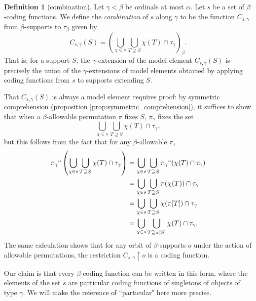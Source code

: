 \documentclass{article}
\theoremstyle{definition}
\newtheorem{definition}[theorem]{Definition}
\theoremstyle{remark}
\begin{document}
\begin{definition}[combination]\label{def:combination}
Let $\gamma < \beta$ be ordinals at most $\alpha$.
Let $s$ be a set of $\beta$-coding functions.
We define the {\em combination\/} of $s$ along $\gamma$ to be the function $C_{s,\gamma}$ from $\beta$-supports to $\tau_\beta$ given by
$$ C_{s,\gamma}(S) = \left( \bigcup_{\chi \in s} \bigcup_{T \supseteq S} \chi(T) \cap \tau_\gamma \right)_\beta. $$
That is, for a support $S$, the $\gamma$-extension of the model element $C_{s,\gamma}(S)$ is precisely the union of the $\gamma$-extensions of model elements obtained by applying coding functions from $s$ to supports extending $S$.

That $C_{s,\gamma}(S)$ is always a model element requires proof: by symmetric comprehension (proposition \ref{prop:symmetric_comprehension}), it suffices to show that when a $\beta$-allowable permutation $\pi$ fixes $S$, $\pi_\gamma$ fixes the set
$$ \bigcup_{\chi \in s} \bigcup_{T \supseteq S} \chi(T) \cap \tau_\gamma, $$
but this follows from the fact that for any $\beta$-allowable $\pi$,
\begin{align*}
  \pi_\gamma``\left(\bigcup_{\chi \in s} \bigcup_{T \supseteq S} \chi(T) \cap \tau_\gamma\right)
  &= \bigcup_{\chi \in s} \bigcup_{T \supseteq S} \pi_\gamma``(\chi(T) \cap \tau_\gamma) \\
  &= \bigcup_{\chi \in s} \bigcup_{T \supseteq S} \pi(\chi(T)) \cap \tau_\gamma \\
  &= \bigcup_{\chi \in s} \bigcup_{T \supseteq S} \chi(\pi[T]) \cap \tau_\gamma \\
  &= \bigcup_{\chi \in s} \bigcup_{T \supseteq \pi[S]} \chi(T) \cap \tau_\gamma.
\end{align*}
The same calculation shows that for any orbit of $\beta$-supports $o$ under the action of allowable permutations, the restriction $C_{s,\gamma} \restriction o$ is a coding function.
\end{definition}

Our claim is that every $\beta$-coding function can be written in this form, where the elements of the set $s$ are particular coding functions of singletons of objects of type $\gamma$.  We will make the reference of ``particular" here more precise.
\end{document}

